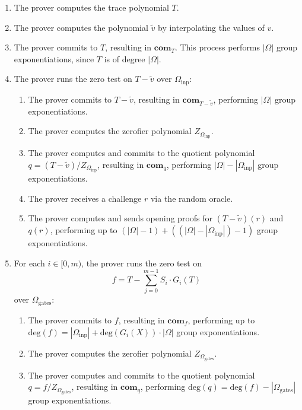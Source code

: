 \documentclass[11pt]{article}
\begin{document}
\begin{enumerate}
	\item The prover computes the trace polynomial $T$.
	\item The prover computes the polynomial $\widetilde{v}$ by interpolating the values of $v$.
	\item The prover commits to $T$, resulting in $\mathbf{com}_T$.
		This process performs $|\Omega|$ group exponentiations, since $T$ is of degree $|\Omega|$.
	\item The prover runs the zero test on $T - \widetilde{v}$ over $\Omega_{\text{inp}}$:
		\begin{enumerate}
			\item The prover commits to $T - \widetilde{v}$, resulting in $\mathbf{com}_{T - \widetilde{v}}$,
				performing $|\Omega|$ group exponentiations.
			\item The prover computes the zerofier polynomial $Z_{\Omega_{\text{inp}}}$.
			\item The prover computes and commits to the quotient polynomial
				$q = (T - \widetilde{v}) / Z_{\Omega_{\text{inp}}}$,
				resulting in $\mathbf{com}_q$, performing $|\Omega| - |\Omega_{\text{inp}}|$
				group exponentiations.
			\item The prover receives a challenge $r$ via the random oracle.
			\item The prover computes and sends opening proofs for $(T - \widetilde{v})(r)$ and $q(r)$,
				performing up to $(|\Omega| - 1) + ((|\Omega| - |\Omega_{\text{inp}}|) - 1)$
				group exponentiations.
		\end{enumerate}
	\item For each $i \in [0,m)$, the prover runs the zero test on
		\begin{equation}
			f = T - \sum_{j=0}^{m-1} S_i \cdot G_i(T)
		\end{equation}
		over $\Omega_{\text{gates}}$:
		\begin{enumerate}
			\item The prover commits to $f$, resulting in $\mathbf{com}_f$,
				performing up to $\text{deg}(f) = |\Omega_{\text{inp}}| + \text{deg}(G_i(X)) \cdot |\Omega|$
				group exponentiations.
			\item The prover computes the zerofier polynomial $Z_{\Omega_{\text{gates}}}$.
			\item The prover computes and commits to the quotient polynomial
				$q = f / Z_{\Omega_{\text{gates}}}$, resulting in $\mathbf{com}_q$,
				performing $\text{deg}(q) = \text{deg}(f) - |\Omega_{\text{gates}}|$ group exponentiations.

\end{enumerate}
\end{enumerate}
\end{document}

